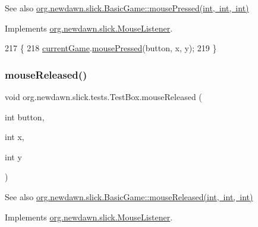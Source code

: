 \begin{DoxySeeAlso}{See also}
\mbox{\hyperlink{classorg_1_1newdawn_1_1slick_1_1_basic_game_af00b33ec970972ecabe458cbc6d66e8a}{org.\+newdawn.\+slick.\+Basic\+Game\+::mouse\+Pressed(int, int, int)}} 
\end{DoxySeeAlso}


Implements \mbox{\hyperlink{interfaceorg_1_1newdawn_1_1slick_1_1_mouse_listener_aeca4c21a38aa31c408f3daf6f86c0925}{org.\+newdawn.\+slick.\+Mouse\+Listener}}.


\begin{DoxyCode}
217                                                        \{
218         \mbox{\hyperlink{classorg_1_1newdawn_1_1slick_1_1tests_1_1_test_box_a5e0fdb2f97173d828af597044c525078}{currentGame}}.\mbox{\hyperlink{classorg_1_1newdawn_1_1slick_1_1_basic_game_af00b33ec970972ecabe458cbc6d66e8a}{mousePressed}}(button, x, y);
219     \}
\end{DoxyCode}
\mbox{\label{classorg_1_1newdawn_1_1slick_1_1tests_1_1_test_box_acef576dfd82777b6a24641b5b3456275}} 
\subsubsection{\texorpdfstring{mouse\+Released()}{mouseReleased()}}
{\footnotesize\ttfamily void org.\+newdawn.\+slick.\+tests.\+Test\+Box.\+mouse\+Released (\begin{DoxyParamCaption}\item[{int}]{button,  }\item[{int}]{x,  }\item[{int}]{y }\end{DoxyParamCaption})\hspace{0.3cm}{\ttfamily [inline]}}

\begin{DoxySeeAlso}{See also}
\mbox{\hyperlink{classorg_1_1newdawn_1_1slick_1_1_basic_game_ad5f3b68d103dc42613e5a35c7f820f72}{org.\+newdawn.\+slick.\+Basic\+Game\+::mouse\+Released(int, int, int)}} 
\end{DoxySeeAlso}


Implements \mbox{\hyperlink{interfaceorg_1_1newdawn_1_1slick_1_1_mouse_listener_a8d1606869f610664f9299565067d5571}{org.\+newdawn.\+slick.\+Mouse\+Listener}}.


